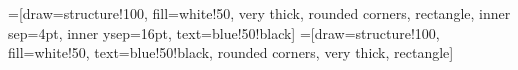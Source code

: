 =[draw=structure!100, fill=white!50, very thick,
rounded corners, rectangle, inner sep=4pt, inner ysep=16pt, text=blue!50!black]
=[draw=structure!100, fill=white!50, text=blue!50!black,
rounded corners, very thick, rectangle]
\newcommand\modelbox[2]{
{\centering
\begin{tikzpicture}
\node [modelbox](box){
\begin{minipage}{0.95\textwidth}\centering
\begin{minipage}{0.95\textwidth}
#2
\end{minipage}\end{minipage}};
\node[modelboxtitle, right=10pt] at (box.north west)
{\small\textbf{\mbox{#1}}};
\end{tikzpicture}\par}
}

\def\domande{Domande}
\def\approfondimenti{Approfondimenti}
\def\esercizi{Esercizi}
\def\esempi{Esempi svolti}
\def\relazioni{Relazioni}
\def\attivitapratica{Attivit\`a pratica}

